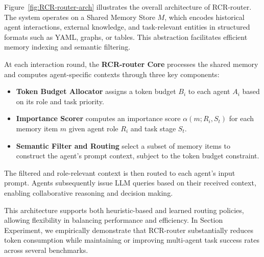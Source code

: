 \documentclass[letterpaper]{article} %
\begin{document}
Figure~\ref{fig:RCR-router-arch} illustrates the overall architecture of RCR-router. The system operates on a Shared Memory Store $M$, which encodes historical agent interactions, external knowledge, and task-relevant entities in structured formats such as YAML, graphs, or tables. This abstraction facilitates efficient memory indexing and semantic filtering.

At each interaction round, the \textbf{RCR-router Core} processes the shared memory and computes agent-specific contexts through three key components:

\begin{itemize}
    \item \textbf{Token Budget Allocator} assigns a token budget $B_i$ to each agent $A_i$ based on its role and task priority.
    \item \textbf{Importance Scorer} computes an importance score $\alpha(m; R_i, S_t)$ for each memory item $m$ given agent role $R_i$ and task stage $S_t$.
    \item \textbf{Semantic Filter and Routing} select a subset of memory items to construct the agent’s prompt context, subject to the token budget constraint.
\end{itemize}

The filtered and role-relevant context is then routed to each agent’s input prompt. Agents subsequently issue LLM queries based on their received context, enabling collaborative reasoning and decision making.

This architecture supports both heuristic-based and learned routing policies, allowing flexibility in balancing performance and efficiency. In Section Experiment, we empirically demonstrate that RCR-router substantially reduces token consumption while maintaining or improving multi-agent task success rates across several benchmarks.
\end{document}
